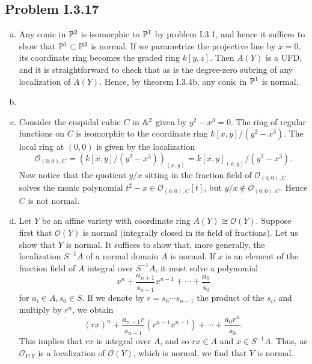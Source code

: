 \documentclass{../mathnotes}
\begin{document}
\subsection*{Problem I.3.17}
\begin{enumerate}[(a)]
    \item Any conic in $\mathbb{P}^2$ is isomorphic to $\mathbb{P}^1$ by problem I.3.1, and hence it
        suffices to show that $\mathbb{P}^1\subset\mathbb{P}^2$ is normal. If we parametrize the
        projective line by $x=0$, its coordinate ring becomes the graded ring $k[y,z]$.
        Then $A(Y)$ is a UFD, and it is straightforward to check that as is the degree-zero
        subring of any localization of $A(Y)$. Hence, by theorem I.3.4b, any conic
        in $\mathbb{P}^1$ is normal.
    \item 
    \item Consider the cuspidal cubic $C$ in $\mathbb{A}^2$ given by $y^2-x^3=0$. The ring of regular
        functions on $C$ is isomorphic to the coordinate ring $k[x,y]/(y^2-x^3)$. The local
        ring at $(0,0)$ is given by the localization
        \[\mathcal{O}_{(0,0),C}=\left( k[x,y]/(y^2-x^3) \right)_{(x,y)}=k[x,y]_{(x,y)}/(y^2-x^3).\]
        Now notice that the quotient $y/x$ sitting in the fraction field of $\mathcal{O}_{(0,0),C}$
        solves the monic polynomial $t^2-x\in\mathcal{O}_{(0,0),C}[t]$, but $y/x\notin\mathcal{O}_{(0,0),C}$.
        Hence $C$ is not normal.
    \item Let $Y$ be an affine variety with coordinate ring $A(Y)\cong\mathcal{O}(Y)$. Suppose
        first that $\mathcal{O}(Y)$ is normal (integrally closed in its field of fractions).
        Let us show that $Y$ is normal. It suffices to show
        that, more generally, the localization $S^{-1}A$ of a normal domain $A$ is normal.
        If $x$ is an element of the fraction field of $A$ integral over $S^{-1}A$, it must solve
        a polynomial
        \[x^n+\frac{a_{n+1}}{s_{n-1}}x^{n-1}+\cdots+\frac{a_0}{s_0}\]
        for $a_i\in A,s_0\in S$. If we denote by $r=s_0\cdots s_{n-1}$ the product of the $s_i$,
        and multiply by $r^n$, we obtain
        \[(rx)^n+\frac{a_{n-1}r}{s_{n-1}}(r^{n-1}x^{n-1})+\cdots+\frac{a_0r^n}{s_0}.\]
        This implies that $rx$ is integral over $A$, and so $rx\in A$ and $x\in S^{-1}A$.
        Thus, as $\mathcal{O}_{P,Y}$ is a localization of $\mathcal{O}(Y)$,
        which is normal, we find that $Y$ is normal.


\end{enumerate}
\end{document}
